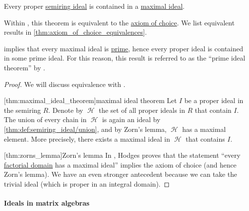 \begin{theorem}\label{thm:maximal_ideal_theorem}
  Every proper \hyperref[def:semiring_ideal]{semiring ideal} is contained in a \hyperref[def:semiring_ideal/maximal]{maximal ideal}.
\end{theorem}
\begin{comments}
  \item Within \hyperref[def:zfc]{}, this theorem is equivalent to the \hyperref[def:zfc/choice]{axiom of choice}. We list equivalent results in \cref{thm:axiom_of_choice_equivalences}.

  \item {} implies that every maximal ideal is \hyperref[def:semiring_ideal/prime]{prime}, hence every proper ideal is contained in some prime ideal. For this reason, this result is referred to as the \enquote{prime ideal theorem} by \textcite{Johnstone1983PointlessTopology}.
\end{comments}
\begin{proof}
  We will discuss equivalence with .

  [thm:maximal_ideal_theorem]{maximal ideal theorem} Let \( I \) be a proper ideal in the semiring \( R \). Denote by \( \mscrH \) the set of all proper ideals in \( R \) that contain \( I \). The union of every chain in \( \mscrH \) is again an ideal by \cref{thm:def:semiring_ideal/union}, and by Zorn's lemma, \( \mscrH \) has a maximal element. More precisely, there exists a maximal ideal in \( \mscrH \) that contains \( I \).

  [thm:zorns_lemma]{Zorn's lemma} In \cite{Hodges1979KrullImpliesZorn}, Hodges proves that the statement \enquote{every \hyperref[def:factorial_domain]{factorial domain} has a maximal ideal} implies the axiom of choice (and hence Zorn's lemma). We have an even stronger antecedent because we can take the trivial ideal (which is proper in an integral domain).
\end{proof}

\paragraph{Ideals in matrix algebras}

